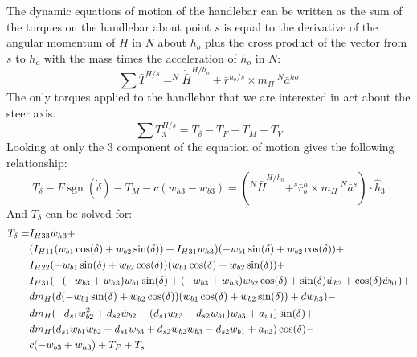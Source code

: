 \documentclass[]{article}
\newcommand{\sgn}{\operatorname{sgn}}
\begin{document}
The dynamic equations of motion of the handlebar can be written as the sum of
the torques on the handlebar about point $s$ is equal to the derivative of the
angular momentum of $H$ in $N$ about $h_o$ plus the cross product of the vector
from $s$ to $h_o$ with the mass times the acceleration of $h_o$ in $N$:
%
\begin{equation}
	\sum \bar{T}^{H/s} = ^N\dot{\bar{H}}^{H/h_o} + \bar{r}^{h_o/s} \times m_H
		\ ^N\bar{a}^{ho}
\end{equation}
%
The only torques applied to the handlebar that we are interested in act about the steer axis.
\begin{equation}
	\sum T^{H/s}_3 = T_\delta - T_F - T_M - T_V
\end{equation}
%
Looking at only the 3 component of the equation of motion gives the following
relationship:
%
\begin{equation}
	T_\delta - F\sgn({\dot{\delta}}) - T_M - c(w_{h3} - w_{b3}) = (^N\dot{\bar{H}}^{H/h_o} + ^s\bar{r}^h_o \times m_H
		\ ^N\bar{a}^s) \cdot \hat{h}_3
\end{equation}
%
And $T_\delta$ can be solved for:
\begin{align}
	T_{\delta} = &
	I_{H33} \dot{w}_{h3} + \\\notag
	& (I_{H11} (w_{b1}\cos(\delta) +
	w_{b2}\sin(\delta)) +
	I_{H31} w_{h3}) (-w_{b1}\sin(\delta) +
	w_{b2}\cos(\delta)) + \\\notag
	& I_{H22} (- w_{b1} \sin(\delta) +
	w_{b2}\cos(\delta))
	(w_{b1}\cos(\delta) +
	w_{b2}\sin(\delta)) + \\\notag
	& I_{H31} (- (- w_{b3} + w_{h3}) w_{b1}
	\sin(\delta) +
	(-w_{b3} + w_{h3})
	w_{b2}\cos(\delta) +
	\sin(\delta)\dot{w}_{b2} +
	\cos(\delta)\dot{w}_{b1}) +\\\notag
	& d m_H (d (-w_{b1}\sin(\delta) + w_{b2}
	\cos(\delta))(w_{b1}\cos(\delta) +
	w_{b2}\sin(\delta)) +
	d \dot{w}_{h3}) - \\\notag
	& d m_H (- d_{s1} w_{b2}^{2} + d_{s2}
	\dot{w}_{b2} - (d_{s1}
	w_{b3} - d_{s2}
	w_{b1}) w_{b3} +
	a_{v1})
	\sin(\delta) +\\\notag
	& d m_H(d_{s1} w_{b1}w_{b2} +
	d_{s1} \dot{w}_{b3} +
	d_{s2} w_{b2} w_{b3} - d_{s2} \dot{w}_{b1} +
	a_{v2})\cos(\delta) - \\\notag
%
	& c (- w_{b3} + w_{h3}) + T_F + T_s
\end{align}
\end{document}

